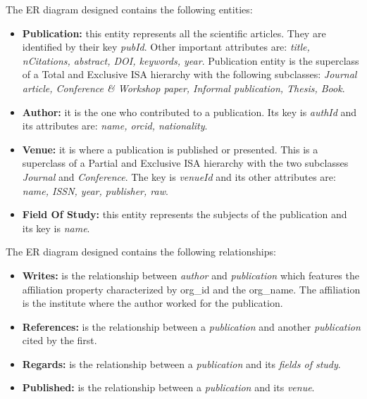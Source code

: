 \documentclass{Configuration_Files/PoliMi3i_thesis}
\begin{document}
\newpage
The ER diagram designed contains the following entities:
\begin{itemize}
    \item \textbf{Publication:} this entity represents all the scientific articles. They are identified by their key \emph{pubId}.
            Other important attributes are: \emph{title, nCitations, abstract, DOI, keywords, year}.
            Publication entity is the superclass of a Total and Exclusive ISA hierarchy with the following subclasses:
            \emph{Journal article, Conference \& Workshop paper, Informal publication, Thesis, Book}.
    \item \textbf{Author:} it is the one who contributed to a publication. Its key is \emph{authId} and its attributes are: \emph{name, orcid, nationality}.
    \item \textbf{Venue:} it is where a publication is published or presented. This is a superclass of a Partial and Exclusive
            ISA hierarchy with the two subclasses \emph{Journal} and \emph{Conference}.
            The key is \emph{venueId} and its other attributes are: \emph{name, ISSN, year, publisher, raw}.
    \item \textbf{Field Of Study:} this entity represents the subjects of the publication and its key is \emph{name}.
\end{itemize}
\bigskip

The ER diagram designed contains the following relationships:
\begin{itemize}
    \item \textbf{Writes:} is the relationship between \emph{author} and \emph{publication} which features the affiliation property
            characterized by org\_id and the org\_name. The affiliation is the institute where the author worked for the publication.
    \item \textbf{References:} is the relationship between a \emph{publication} and another \emph{publication} cited by the first.
    \item \textbf{Regards:} is the relationship between a \emph{publication} and its \emph{fields of study}.
    \item \textbf{Published:} is the relationship between a \emph{publication} and its \emph{venue}.
\end{itemize}
\end{document}
